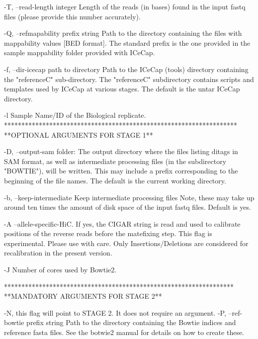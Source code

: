 \documentclass[10pt,a4paper]{article}
\begin{document}
        -T, --read-length integer    Length of the reads (in bases) found in the input fastq files (please provide this number accurately).

        -Q, --refmapability prefix string    Path to the directory containing the files with mappability values [BED format].  The standard prefix is the one provided in the sample mappability folder provided with ICeCap. 

        -f, --dir-icecap path to directory     Path to the ICeCap (tools) directory containing the "referenceC" sub-directory.  The "referenceC" subdirectory contains scripts and templates used by ICeCap at various stages.  The default is the untar ICeCap directory.
       
        -l Sample Name/ID of the Biological replicate.\\

*******************************************************************\\
**OPTIONAL ARGUMENTS FOR STAGE 1**

        -D, --output-sam folder: The output directory where the files listing ditags in SAM format, as well as intermediate processing files (in the subdirectory "BOWTIE"), will be written.  This may include a prefix corresponding to the beginning of the file names.  The default is the current working directory.
       
        -b, --keep-intermediate    Keep intermediate processing files Note, these may take up around ten times the amount of disk space of the input fastq files. Default is yes.

        -A   --allele-specific-HiC. If yes, the CIGAR string is read and used to calibrate positions of the reverse reads before the matefixing step.
                                    This flag is experimental. Please use with care. Only Insertions/Deletions are considered for recalibration in the 
                                    present version.

        -J  Number of cores used by Bowtie2.

******************************************************************\\
**MANDATORY ARGUMENTS FOR STAGE 2**

        -N, this flag will point to STAGE 2. It does not require an argument.
        -P, --ref-bowtie prefix string     Path to the directory containing the Bowtie indices and reference fasta files. See the botwie2 manual for details on how to create these.
\end{document}

